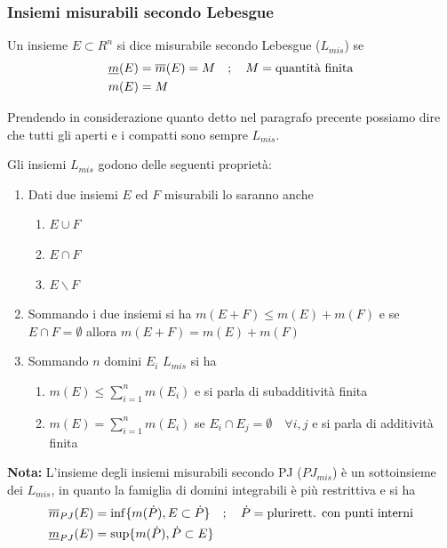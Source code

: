 \newpage

\subsubsection{Insiemi misurabili secondo Lebesgue}

Un insieme $E \subset R^n$ si dice misurabile secondo Lebesgue ($L_{mis}$) se
\begin{align}
	{}&\underline{m}(E) =\overline{m}(E) = M  \quad ; \quad M= \text{quantità finita}\\
	&m(E)=M
\end{align}

Prendendo in considerazione quanto detto nel paragrafo precente possiamo dire che tutti gli aperti e i compatti sono sempre $L_{mis}$.

Gli insiemi $L_{mis}$ godono delle seguenti proprietà:
\begin{enumerate}
	\item Dati due insiemi $E$ ed $F$ misurabili lo saranno anche 
	\begin{enumerate}
		\item $E\cup F$
		\item $E\cap F$
		\item $E \backslash F$ 
	\end{enumerate}
	\item Sommando i due insiemi si ha $m(E+F)\leq m(E) + m(F)$ e se $E\cap F = \emptyset$ allora $m(E+F)= m(E) + m(F)$
	\item Sommando $n$ domini $E_i$ $L_{mis}$ si ha
	\begin{enumerate}
		\item $	m(E) \leq \sum_{i=1}^{n} m(E_i)$ e si parla di subadditività finita
		\item $m(E) = \sum_{i=1}^{n} m(E_i)$ se $E_i  \cap E_j = \emptyset \quad \forall i,j$ e si parla di additività finita
	\end{enumerate}
\end{enumerate}

\textbf{Nota:} L'insieme degli insiemi misurabili secondo PJ ($PJ_{mis}$) è un sottoinsieme dei $L_{mis}$, in quanto la famiglia di domini integrabili è più restrittiva e si ha
\begin{align}
	{}&\overline{m}_{PJ}(E)=\inf \{ m(\dot{P}), E \subset \dot{P} \} \quad ; \quad \dot{P} = \text{plurirett. con punti interni}  \\
	&\underline{m}_{PJ}(E)=\sup \{ m(\dot{P}), \dot{P} \subset E \}
\end{align}

